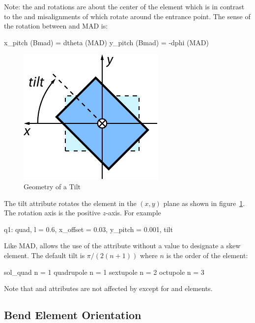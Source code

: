 Note: the  and  rotations are about the center of the element which is in contrast
to the  and  misalignments of \mad which rotate around the entrance point. The
sense of the rotation between \bmad and MAD is:
\begin{example}
  x_pitch (Bmad) =  dtheta (MAD)
  y_pitch (Bmad) = -dphi (MAD)
\end{example}

\begin{figure}[tb]
  \centering
  \includegraphics{tilt.pdf}
  \caption{Geometry of a Tilt}
  \label{f:tilt}
\end{figure}

The tilt attribute rotates the element in the $(x, y)$ plane as shown in figure~\ref{f:tilt}. The
rotation axis is the positive $z$-axis. For example
\begin{example}
  q1: quad, l = 0.6, x_offset = 0.03, y_pitch = 0.001, tilt
\end{example}
Like MAD, \bmad allows the use of the  attribute without a value to designate a skew
element. The default tilt is $\pi/(2(n+1))$ where $n$ is the order of the element:
\begin{example}
  sol_quad       n = 1
  quadrupole     n = 1
  sextupole      n = 2
  octupole       n = 3
\end{example}

Note that  and  attributes are not affected by  except for 
and  elements.

\subsection{Bend Element Orientation}
\label{s:bend.orient}

